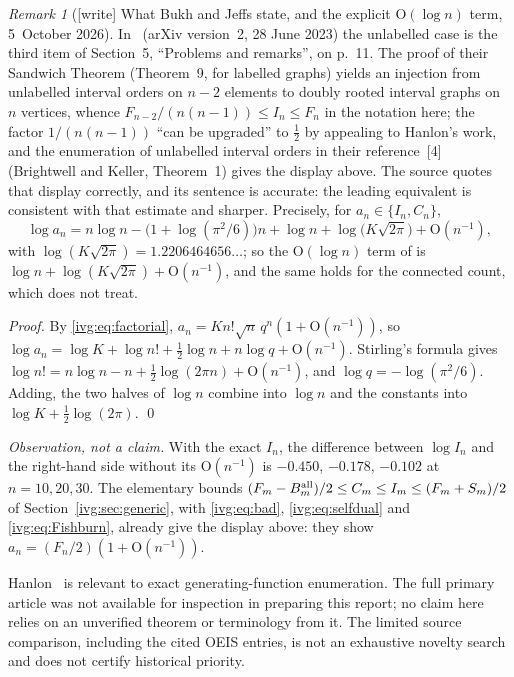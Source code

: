 \documentclass[11pt,letterpaper]{article}
\theoremstyle{definition}\newtheorem{definition}[theorem]{Definition}
\theoremstyle{remark}\newtheorem{remark}[theorem]{Remark}
\newcommand{\OO}{\mathrm O}
\begin{document}
\begin{remark}[{[write]} What Bukh and Jeffs state, and the explicit $\OO(\log n)$ term, 5~October 2026]\label{ivg:rem:bukhjeffs}
In~\cite{BJ} (arXiv version~2, 28 June 2023) the unlabelled case is the
third item of Section~5, ``Problems and remarks'', on p.~11. The proof of
their Sandwich Theorem (Theorem~9, for labelled graphs) yields an injection
from unlabelled interval orders on $n-2$ elements to doubly rooted interval
graphs on $n$ vertices, whence $F_{n-2}/(n(n-1))\le I_n\le F_n$ in the
notation here; the factor $1/(n(n-1))$ ``can be upgraded'' to $\tfrac12$ by
appealing to Hanlon's work, and the enumeration of unlabelled interval orders
in their reference~[4] (Brightwell and Keller, Theorem~1) gives the display
above. The source quotes that display correctly, and its sentence is
accurate: the leading equivalent is consistent with that estimate and
sharper. Precisely, for $a_n\in\{I_n,C_n\}$,
\[
 \log a_n=n\log n-\bigl(1+\log(\pi^2/6)\bigr)n+\log n
 +\log\bigl(K\sqrt{2\pi}\bigr)+\OO(n^{-1}),
\]
with $\log(K\sqrt{2\pi})=1.2206464656\ldots$; so the $\OO(\log n)$ term of
\cite{BJ} is $\log n+\log(K\sqrt{2\pi})+\OO(n^{-1})$, and the same holds for
the connected count, which \cite{BJ} does not treat.

\emph{Proof.} By \eqref{ivg:eq:factorial},
$a_n=Kn!\sqrt n\,q^n(1+\OO(n^{-1}))$, so
$\log a_n=\log K+\log n!+\tfrac12\log n+n\log q+\OO(n^{-1})$. Stirling's
formula gives $\log n!=n\log n-n+\tfrac12\log(2\pi n)+\OO(n^{-1})$, and
$\log q=-\log(\pi^2/6)$. Adding, the two halves of $\log n$ combine into
$\log n$ and the constants into $\log K+\tfrac12\log(2\pi)$. \qed

\emph{Observation, not a claim.} With the exact $I_n$, the difference
between $\log I_n$ and the right-hand side without its $\OO(n^{-1})$ is
$-0.450$, $-0.178$, $-0.102$ at $n=10,20,30$. The elementary bounds
$(F_m-B_m^{\rm all})/2\le C_m\le I_m\le(F_m+S_m)/2$ of
Section~\ref{ivg:sec:generic}, with \eqref{ivg:eq:bad},
\eqref{ivg:eq:selfdual} and \eqref{ivg:eq:Fishburn}, already give the display
above: they show $a_n=(F_n/2)(1+\OO(n^{-1}))$.
\end{remark}

Hanlon~\cite{Hanlon} is relevant to exact generating-function enumeration. The full primary article was not available for inspection in preparing this report; no claim here relies on an unverified theorem or terminology from it. The limited source comparison, including the cited OEIS entries, is not an exhaustive novelty search and does not certify historical priority.
\end{document}

